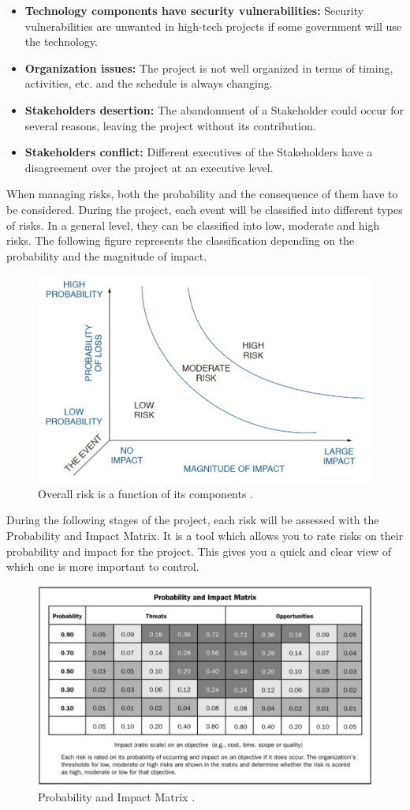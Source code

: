 \begin{itemize}
	\item \textbf{Technology components have security vulnerabilities:} Security vulnerabilities are unwanted in high-tech projects if some government will use the technology.
	
	\item \textbf{Organization issues:} The project is not well organized in terms of timing, activities, etc. and the schedule is always changing.
	
	\item \textbf{Stakeholders desertion:} The abandonment of a Stakeholder could occur for several reasons, leaving the project without its contribution.
	
	\item \textbf{Stakeholders conflict:} Different executives of the Stakeholders have a disagreement over the project at an executive level.
	
	
\end{itemize}

When managing risks, both the probability and the consequence of them have to be considered. During the project, each event will be classified into different types of risks. In a general level, they can be classified into low, moderate and high risks. The following figure represents the classification depending on the probability and the magnitude of impact.

\begin{figure}[H]
	\centering
	\includegraphics[width=0.65\linewidth]{./images/risks1}
	\caption{Overall risk is a function of its components \cite{Kerzner2009}.}
	\label{fig:risks1}
\end{figure}

During the following stages of the project, each risk will be assessed with the Probability and Impact Matrix. It is a tool which allows you to rate risks on their probability and impact for the project. This gives you a quick and clear view of which one is more important to control.

\begin{figure}[H]
	\centering
	\includegraphics[width=\linewidth]{./images/risks2}
	\caption{Probability and Impact Matrix \cite{GuideProjectManag}.}
	\label{fig:risks2}
\end{figure}
